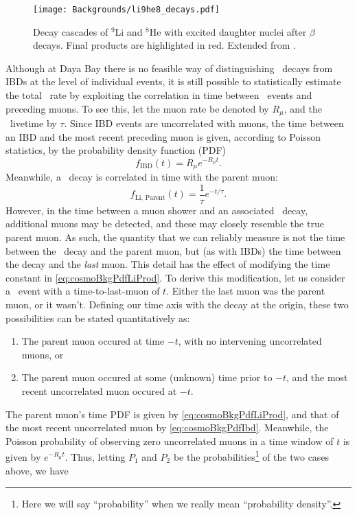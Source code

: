 \documentclass[../thesis.tex]{subfiles}
\begin{document}
\begin{figure}[h]
  \texttt{[image: Backgrounds/li9he8\_decays.pdf]}
  \caption{Decay cascades of $^9$Li and $^8$He with excited daughter nuclei after $\beta$ decays. Final products are highlighted in red. Extended from \cite{pedroLi9Spec2}.}
  \label{fig:li9he8_decays}
\end{figure}

Although at Daya Bay there is no feasible way of distinguishing \linine\ decays from IBDs at the level of individual events, it is still possible to statistically estimate the total \linine\ rate by exploiting the correlation in time between \linine\ events and preceding muons. To see this, let the muon rate be denoted by $R_\mu$, and the \linine\ livetime by $\tau$. Since IBD events are uncorrelated with muons, the time between an IBD and the most recent preceding muon is given, according to Poisson statistics, by the probability density function (PDF)
\begin{equation}
  \label{eq:cosmoBkgPdfIbd}
  f_{\mathrm{IBD}}(t) = R_\mu e^{-R_\mu t}.
\end{equation}
Meanwhile, a \linine\ decay is correlated in time with the parent muon:
\begin{equation}
  \label{eq:cosmoBkgPdfLiProd}
  f_{\mathrm{Li,\,Parent}}(t) = \frac{1}{\tau} e^{-t/\tau}.
\end{equation}
However, in the time between a muon shower and an associated \linine\ decay, additional muons may be detected, and these may closely resemble the true parent muon. As such, the quantity that we can reliably measure is not the time between the \linine\ decay and the parent muon, but (as with IBDs) the time between the decay and the \emph{last} muon. This detail has the effect of modifying the time constant in \autoref{eq:cosmoBkgPdfLiProd}. To derive this modification, let us consider a \linine\ event with a time-to-last-muon of $t$. Either the last muon was the parent muon, or it wasn't. Defining our time axis with the decay at the origin, these two possibilities can be stated quantitatively as:
\begin{enumerate}
\item The parent muon occured at time $-t$, with no intervening uncorrelated muons, or
\item The parent muon occured at some (unknown) time prior to $-t$, and the most recent uncorrelated muon occured at $-t$.
\end{enumerate}
The parent muon's time PDF is given by \autoref{eq:cosmoBkgPdfLiProd}, and that of the most recent uncorrelated muon by \autoref{eq:cosmoBkgPdfIbd}. Meanwhile, the Poisson probability of observing zero uncorrelated muons in a time window of $t$ is given by $e^{-R_\mu t}$. Thus, letting $P_1$ and $P_2$ be the probabilities\footnote{Here we will say ``probability'' when we really mean ``probability density''.} of the two cases above, we have
\end{document}
